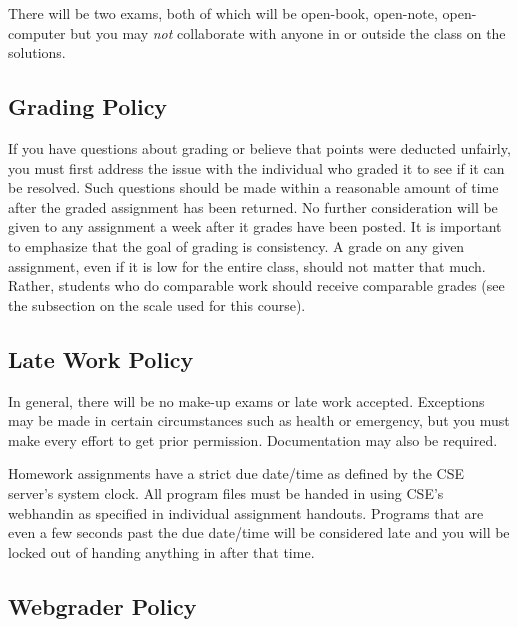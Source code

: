 \documentclass[12pt]{scrartcl}
\begin{document}
There will be two exams, both of which will be open-book, open-note,
open-computer but you may \emph{not} collaborate with anyone
in or outside the class on the solutions.

%

\subsection{Grading Policy}

If you have questions about grading or believe that points were 
deducted unfairly, you must first address the issue with the 
individual who graded it to see if it can be resolved.  Such 
questions should be made within a reasonable amount of time 
after the graded assignment has been returned.  No further 
consideration will be given to any assignment a week after 
it grades have been posted.  It is important to emphasize that 
the goal of grading is consistency.  A grade on any given 
assignment, even if it is low for the entire class, should 
not matter that much.  Rather, students who do comparable 
work should receive comparable grades (see the subsection 
on the scale used for this course).

\subsection{Late Work Policy}

In general, there will be no make-up exams or late work
accepted.  Exceptions may be made in certain circumstances 
such as health or emergency, but you must make every effort 
to get prior permission.  Documentation may also be required.

Homework assignments have a strict due date/time as defined by
the CSE server's system clock.  All program files must be handed
in using CSE's webhandin as specified in individual assignment
handouts.  Programs that are even a few seconds past the due 
date/time will be considered late and you will be locked out
of handing anything in after that time.  

\subsection{Webgrader Policy}
\end{document}
